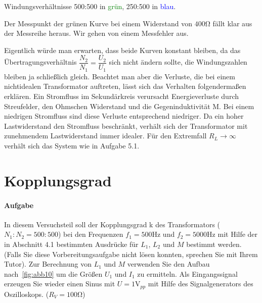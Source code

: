 \documentclass[10pt]{scrreprt}
\begin{document}
        Windungsverhältnisse 500:500 in \textcolor{green}{grün}, 250:500 in \textcolor{blue}{blau}.
        \begin{center}
        \end{center}

        Der Messpunkt der grünen Kurve bei einem Widerstand von $400\si{\ohm}$
        fällt klar aus der Messreihe heraus. Wir gehen von einem Messfehler aus.

        \vspace{0.5cm}

        Eigentlich würde man erwarten, dass beide Kurven konstant bleiben, da
        das Übertragungsverhältnis $\dfrac{N_2}{N_1} = \dfrac{U_2}{U_1}$ sich
        nicht ändern sollte, die Windungszahlen bleiben ja schließlich gleich.
        Beachtet man aber die Verluste, die bei einem nichtidealen
        Transformator auftreten, lässt sich das Verhalten folgendermaßen erklären.
        Ein Stromfluss im Sekundärkreis verursacht Energieverluste durch Streufelder,
        den Ohmschen Widerstand und die Gegeninduktivität M. Bei einem niedrigen
        Stromfluss sind diese Verluste entsprechend niedriger. Da ein hoher Lastwiderstand
        den Stromfluss beschränkt, verhält sich der Transformator mit zunehmendem
        Lastwiderstand immer idealer. Für den Extremfall $R_L \rightarrow \infty$
        verhält sich das System wie in Aufgabe 5.1.


        \section{Kopplungsgrad}
        \paragraph{Aufgabe}
        In diesem Versuchsteil soll der Kopplungsgrad k des Transformators ($N_1 : N_2 = 500 : 500$)
        bei den Frequenzen $f_1 = 500\si{\hertz}$ und $f_2 = 5000\si{\hertz}$ mit Hilfe der in Abschnitt 4.1
        bestimmten Ausdrücke für $L_1$, $L_2$ und $M$ bestimmt werden. (Falls Sie diese Vorbereitungsaufgabe
        nicht lösen konnten, sprechen Sie mit Ihrem Tutor). Zur Berechnung von $L_1$ und $M$
        verwenden Sie den Aufbau nach~\ref{fig:abb10} um die Größen $U_1$ und $I_1$ zu ermitteln. Als
        Eingangssignal erzeugen Sie wieder einen Sinus mit $U = 1\si{\volt}_{pp}$ mit Hilfe des
        Signalgenerators des Oszilloskops. ($R_V = 100\si{\ohm}$)
\end{document}
